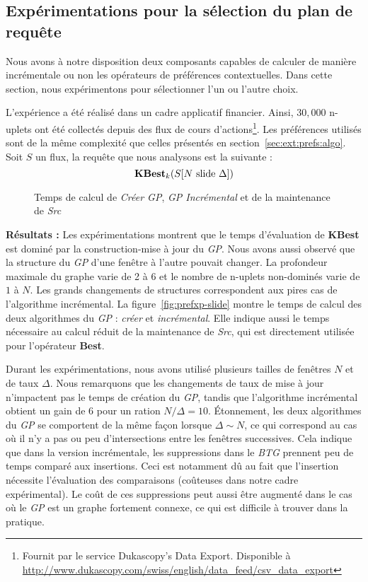 \subsection{Expérimentations pour la sélection du plan de requête}
Nous avons à notre disposition deux composants capables de calculer de manière incrémentale ou non les opérateurs de préférences contextuelles. Dans cette section, nous expérimentons pour sélectionner l'un ou l'autre choix.

L'expérience a été réalisé dans un cadre applicatif financier. Ainsi, $30,000$ n-uplets ont été collectés depuis des flux de cours d'actions\footnote{Fournit par le service Dukascopy's Data Export. Disponible à \url{http://www.dukascopy.com/swiss/english/data_feed/csv_data_export}}. Les préférences utilisés sont de la même complexité que celles présentés en section~\ref{sec:ext:prefs:algo}. Soit $S$ un flux, la requête que nous analysons est la suivante : $${\bf KBest}_k(S[N \textrm{ slide } \Delta])$$

\begin{figure}[ht]
\caption{Temps de calcul de \textit{Créer GP}, \textit{GP Incrémental} et de la maintenance de \textit{Src}}\label{fig:prefxp}
\end{figure}

\textbf{Résultats :} Les expérimentations montrent que le temps d'évaluation de \textbf{KBest} est dominé par la construction-mise à jour du \textit{GP}. Nous avons aussi observé que la structure du \textit{GP} d'une fenêtre à l'autre pouvait changer. La profondeur maximale du graphe varie de 2 à 6 et le nombre de n-uplets non-dominés varie de $1$ à $N$. Les grands changements de structures correspondent aux pires cas de l'algorithme incrémental. La figure~\ref{fig:prefxp-slide} montre le temps de calcul des deux algorithmes du \textit{GP} : \textit{créer} et \textit{incrémental}. Elle indique aussi le temps nécessaire au calcul réduit de la maintenance de \textit{Src}, qui est directement utilisée pour l'opérateur \textbf{Best}. 

Durant les expérimentations, nous avons utilisé plusieurs tailles de fenêtres $N$ et de taux $\Delta$. Nous remarquons que les changements de taux de mise à jour n'impactent pas le temps de création du \textit{GP}, tandis que l'algorithme incrémental obtient un gain de 6 pour un ration $N/\Delta=10$. Étonnement, les deux algorithmes du \textit{GP} se comportent de la même façon lorsque $\Delta\sim N$, ce qui correspond au cas où il n'y a pas ou peu d'intersections entre les fenêtres successives. Cela indique que dans la version incrémentale, les suppressions dans le \textit{BTG} prennent peu de temps comparé aux insertions. Ceci est notamment dû au fait que l'insertion nécessite l'évaluation des comparaisons (coûteuses dans notre cadre expérimental). Le coût de ces suppressions peut aussi être augmenté dans le cas où le \textit{GP} est un graphe fortement connexe, ce qui est difficile à trouver dans la pratique.


